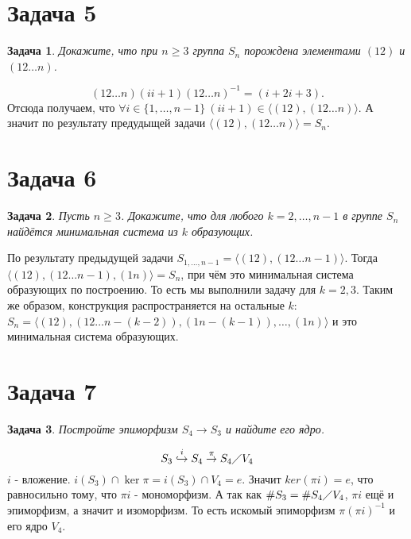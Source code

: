 \documentclass{article}
\newtheorem{task}{Задача}
\newcommand{\gen}[1]{\langle #1 \rangle}
\newcommand{\srange}[2]{\{#1, \dots, #2\}}
\newcommand{\range}[2]{#1, \dots, #2}
\newcommand{\ad}[2]{#1#2#1^{-1}}
\newcommand{\epi}[1]{\overset{#1}{\to}}
\newcommand{\mono}[1]{\overset{#1}{\hookrightarrow}}
\newcommand{\quotient}[2]{#1 \diagup #2}
\begin{document}
\section*{Задача 5}

\begin{task}
Докажите, что при $n \geq 3$ группа $S_n$ порождена элементами $(12)$ и $(12 \dots n)$.
\end{task}

\begin{equation*}
    \ad{(12 \dots n)}{(ii+1)} = (i+2 i+3).
\end{equation*}
Отсюда получаем, что $\forall i \in \srange{1}{n - 1} ~ (i i+1) \in \gen{(12), (12 \dots n)}$.
А значит по результату предудыщей задачи $\gen{(12), (12 \dots n)} = S_n$.

\section*{Задача 6}

\begin{task}
Пусть $n \geq 3$. Докажите, что для любого $k = \range{2}{n - 1}$ в группе $S_n$ 
найдётся минимальная система из $k$ образующих.  
\end{task}

По результату предыдущей задачи $S_{\range{1}{n - 1}} = \gen{(12), (12 \dots n - 1)}$.
Тогда $\gen{(12), (12 \dots n - 1), (1n)} = S_n$, 
при чём это минимальная система образующих по построению. То есть мы выполнили задачу для $k = 2, 3$.
Таким же образом, конструкция распространяется на остальные $k$:
$S_n = \gen{(12), (12 \dots n - (k - 2)), (1 n - (k - 1)), \dots, (1 n)}$ 
и это минимальная система образующих.

\section*{Задача 7}
\begin{task}
Постройте эпиморфизм $S_4 \to S_3$ и найдите его ядро.
\end{task}
\begin{equation*}
S_3 \mono{i} S_4 \epi{\pi} \quotient{S_4}{V_4}
\end{equation*}
$i$ - вложение. $i(S_3) \cap \ker\pi = i(S_3) \cap V_4 = {e}.$
Значит $ker( \pi i ) = e$, что равносильно тому, что $\pi i$ - мономорфизм.
А так как $\#S_3 = \#\quotient{S_4}{V_4}$, $\pi i$ ещё и эпиморфизм, а значит и изоморфизм.
То есть искомый эпиморфизм $\pi(\pi i)^{-1}$ и его ядро $V_4$.
\end{document}
